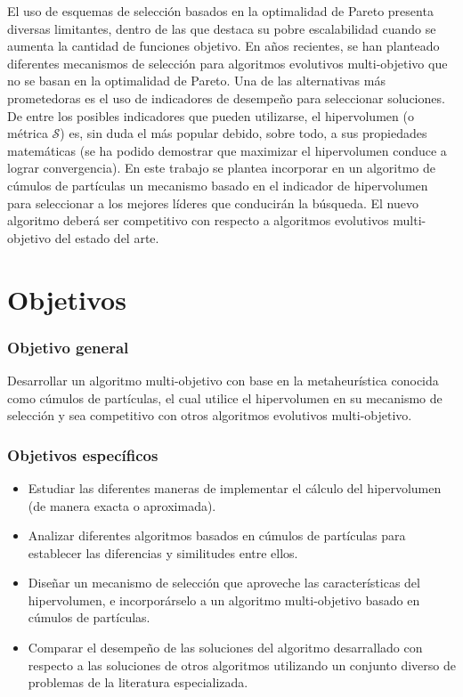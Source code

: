 El uso de esquemas de selecci\'on basados en la optimalidad de Pareto presenta diversas limitantes, dentro de las que destaca
su pobre escalabilidad cuando se aumenta la cantidad de funciones objetivo. En a\~nos recientes, se han planteado diferentes 
mecanismos de selecci\'on para algoritmos evolutivos multi-objetivo que no se basan en la optimalidad de Pareto. Una de las 
alternativas m\'as prometedoras es el uso de indicadores de desempe\~no para seleccionar soluciones. De entre los posibles 
indicadores que pueden utilizarse, el hipervolumen (o m\'etrica $\mathcal{S}$) es, sin duda el m\'as popular debido, sobre 
todo, a sus propiedades matem\'aticas (se ha podido demostrar que maximizar el hipervolumen conduce a lograr convergencia). 
En este trabajo se plantea incorporar en un algoritmo de c\'umulos de part\'iculas un mecanismo  basado en el indicador de 
hipervolumen para seleccionar a los mejores l\'ideres que conducir\'an la b\'usqueda. El nuevo algoritmo deber\'a ser competitivo
con respecto a algoritmos evolutivos multi-objetivo del estado del arte.

\section*{Objetivos}

\subsubsection*{Objetivo general}

Desarrollar un algoritmo multi-objetivo con base en la metaheur\'istica conocida como c\'umulos de part\'iculas, el cual utilice el 
hipervolumen en su mecanismo de selecci\'on y sea competitivo con otros algoritmos evolutivos multi-objetivo.

\subsubsection*{Objetivos espec\'ificos}

\begin{itemize}
 \item Estudiar las diferentes maneras de implementar el c\'alculo del hipervolumen (de manera exacta o aproximada).
 \item Analizar diferentes algoritmos basados en c\'umulos de part\'iculas para establecer las diferencias y 
      similitudes entre ellos.
 \item Dise\~nar un mecanismo de selecci\'on que aproveche las caracter\'isticas del hipervolumen, e incorpor\'arselo 
 a un algoritmo multi-objetivo basado en c\'umulos de part\'iculas.
 \item Comparar el desempe\~no de las soluciones del algoritmo desarrallado con respecto a las soluciones de otros algoritmos
  utilizando un conjunto diverso de problemas de la literatura especializada.
\end{itemize}


